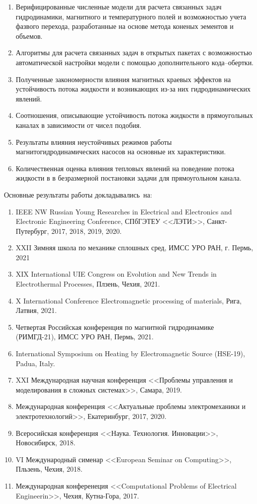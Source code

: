 {}
\begin{enumerate}[beginpenalty=10000] %
  \item Верифицированные численные модели  для расчета связанных задач гидродинамики, магнитного и температурного полей и возможностью учета фазвого перехода, разработанные на основе метода коненых эементов и объемов. 
  \item Алгоритмы для расчета связанных задач в открытых пакетах с возможностью автоматической настройки модели с помощью дополнительного кода--обертки. 
  \item Полученные закономерности влияния магнитных краевых эффектов на устойчивость потока жидкости и возникающих из-за них гидродинамических явлений.
  \item Соотношения, описывающие устойчивость потока жидкости в прямоугольных каналах в зависимости от чисел подобия. 
  \item Результаты влияния неустойчивых режимов работы магнитогидродинамических насосов на основные их характеристики. 
  \item Количественная оценка влияния тепловых явлений на поведение потока жидкости в в безразмерной постановки задачи для прямоугольном канала. 
  
\end{enumerate}


{\probation}
Основные результаты работы докладывались~на:
\begin{enumerate}[beginpenalty=10000] %
    \item IEEE NW Russian Young Researches in Electrical and Electronics and Electronic Engineering Conference, СПбГЭТЕУ <<ЛЭТИ>>, Санкт-Путербург, 2017, 2018, 2019, 2020. 
    \item XXII Зимняя школа по механике сплошных сред, ИМСС УРО РАН, г. Пермь, 2021
    \item XIX International UIE Congress on Evolution and New Trends in Electrothermal Processes, Плзень, Чехия, 2021. 
    \item X International Conference Electromagnetic processing of materials, Рига, Латвия, 2021.
    \item Четвертая Российская конференция по магнитной гидродинамике (РИМГД-21), ИМСС УРО РАН, Пермь, 2021.
    \item International Symposium on Heating by Electromagnetic Source (HSE-19), Padua, Italy.
    \item XXI Международная научная конференция <<Проблемы управления и моделирования в сложных системах>>, Самара, 2019.
    \item Международная конференция <<Актуальные проблемы электромеханики и электротехнологий>>, Екатеринбург, 2017, 2020. 
    \item Всеросийская конференция <<Наука. Технология. Инновации>>, Новосибирск, 2018. 
    \item VI Международный сименар  <<European Seminar on Computing>>, Пльзень, Чехия, 2018.
    \item Международная конференеция <<Computational Problems of Electrical Engineerin>>, Чехия, Кутна-Гора, 2017. 
\end{enumerate}

